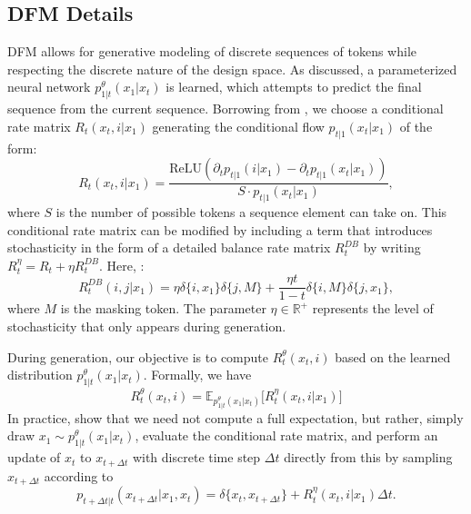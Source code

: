 \subsection{DFM Details}\label{app:SI_DFM}
DFM allows for generative modeling of discrete sequences of tokens while respecting the discrete nature of the design space. As discussed, a parameterized neural network $p_{1|t}^\theta(x_1|x_t)$ is learned, which attempts to predict the final sequence from the current sequence. Borrowing from \citet{campbell_generative_2024}, we choose a conditional rate matrix $R_t(x_t,i|x_1)$ generating the conditional flow $p_{t|1}(x_t|x_1)$ of the form:
\begin{equation}
    R_t(x_t,i|x_1) = \frac{\mathrm{ReLU} \left( \partial_t p_{t|1}(i|x_1) - \partial_t p_{t|1}(x_t|x_1) \right)}{S \cdot p_{t|1}(x_t|x_1)},
\end{equation}
where $S$ is the number of possible tokens a sequence element can take on. This conditional rate matrix can be modified by including a term that introduces stochasticity in the form of a detailed balance rate matrix $R_t^{DB}$ by writing $R_t^\eta = R_t + \eta R_t^{DB}$. Here, \citep{campbell_generative_2024}:
\begin{equation}
    R_t^{DB}(i,j|x_1) = \eta \delta \{ i,x_1 \} \delta\{j,M\}+ \frac{\eta t}{1-t} \delta \{ i,M \} \delta \{ j,x_1 \},
\label{eq:rate_matr}
\end{equation}
where $M$ is the masking token. The parameter $\eta \in \mathbb{R}^{+}$ represents the level of stochasticity that only appears during generation. 

During generation, our objective is to compute $R^\theta_t(x_t,i)$ based on the learned distribution $p_{1|t}^\theta(x_1|x_t)$. Formally, we have
\begin{equation}
    R^\theta_t(x_t,i) = \mathbb{E}_{p_{1|t}^\theta(x_1|x_t)} \big[ R_t^\eta(x_t, i | x_1) \big]
\label{eq:uncond_rate_matr}
\end{equation}
In practice, \citet{campbell_generative_2024} show that we need not compute a full expectation, but rather, simply draw $x_1 \sim p_{1|t}^\theta(x_1|x_t)$, evaluate the conditional rate matrix, and perform an update of $x_t$ to $x_{t+\Delta t}$ with discrete time step $\Delta t$ directly from this by sampling $x_{t+\Delta t}$ according to
\begin{equation}
    p_{t+\Delta t | t}(x_{t+\Delta t} | x_1, x_t) = \delta \{ x_t, x_{t+\Delta t} \} + R_t^\eta(x_t,i|x_1) \Delta t.
\label{eq:discrete_euler}
\end{equation}

